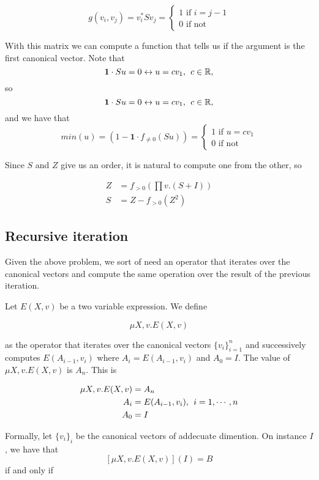 \[
  			g(v_i, v_j)=v_i^*Sv_j=\begin{cases}
               1 \text{ if } i = j - 1 \\
               0 \text{ if not}
            \end{cases}
		\]
		
With this matrix we can compute a function that tells us if the argument is the first canonical vector. Note that $$\mathbf{1}\cdot Su=0\leftrightarrow u=cv_1, \hspace{1ex} c\in\mathbb{R},$$ so $$\mathbf{1}\cdot Su=0\leftrightarrow u=cv_1, \hspace{1ex} c\in\mathbb{R},$$ and we have that
\[
  			min(u)=(1-\mathbf{1}\cdot f_{\neq 0}(Su))=\begin{cases}
               1 \text{ if } u = cv_1 \\
               0 \text{ if not}
            \end{cases}
		\]

Since $S$ and $Z$ give us an order, it is natural to compute one from the other, so

\begin{align*}
Z&=f_{>0}\left(\prod v. (S+I)\right) \\
S&=Z-f_{>0}(Z^2)
\end{align*}

\subsection*{Recursive iteration}

Given the above problem, we sort of need an operator that iterates over the canonical vectors and compute the same operation over the result of the previous iteration.

Let $E(X,v)$ be a two variable expression. We define

$$\mu X, v.E(X,v)$$

as the operator that iterates over the canonical vectors $\lbrace v_i\rbrace_{i=1}^n$ and successively computes $E(A_{i-1}, v_i)$ where $A_i=E(A_{i-1}, v_{i})$ and $A_0=I$. The value of $\mu X, v.E(X,v)$ is $A_n$. This is

\begin{align*}
\mu X, v.E(X,v)&=A_n \\
A_i&=E(A_{i-1}, v_{i}),\hspace{1ex}i=1,\cdots, n \\
A_0&=I
\end{align*}

Formally, let $\lbrace v_i\rbrace_i$ be the canonical vectors of addecuate dimention. On instance $I$, we have that $$\left[\mu X, v. E(X,v)\right](I)=B$$ if and only if

